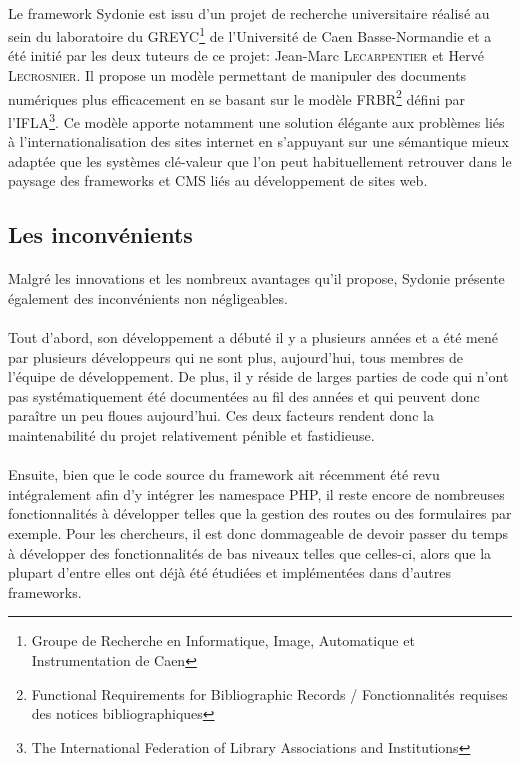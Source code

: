         \paragraph{}
        Le framework \og{}Sydonie\fg{} est issu d'un projet de recherche universitaire réalisé au sein du laboratoire du GREYC\footnote{Groupe de Recherche en Informatique, Image, Automatique et Instrumentation de Caen} de l'Université de Caen Basse-Normandie et a été initié par les deux tuteurs de ce projet: Jean-Marc \textsc{Lecarpentier} et Hervé \textsc{Lecrosnier}. Il propose un modèle permettant de manipuler des documents numériques plus efficacement en se basant sur le modèle FRBR\footnote{Functional Requirements for Bibliographic Records / Fonctionnalités requises des notices bibliographiques} défini par l'IFLA\footnote{The International Federation of Library Associations and Institutions}. Ce modèle apporte notamment une solution élégante aux problèmes liés à l'internationalisation des sites internet en s'appuyant sur une sémantique mieux adaptée que les systèmes \og{}clé-valeur\fg{} que l'on peut habituellement retrouver dans le paysage des frameworks et CMS liés au développement de sites web.


        \subsection{Les inconvénients}
        \paragraph{}
        Malgré les innovations et les nombreux avantages qu'il propose, Sydonie présente également des inconvénients non négligeables.

        \paragraph{}
        Tout d'abord, son développement a débuté il y a plusieurs années et a été mené par plusieurs développeurs qui ne sont plus, aujourd'hui, tous membres de l'équipe de développement. De plus, il y réside de larges parties de code qui n'ont pas systématiquement été documentées au fil des années et qui peuvent donc paraître un peu floues aujourd'hui. Ces deux facteurs rendent donc la maintenabilité du projet relativement pénible et fastidieuse.

        \paragraph{}
        Ensuite, bien que le code source du framework ait récemment été  revu intégralement afin d'y intégrer les namespace PHP, il reste encore de nombreuses fonctionnalités à développer telles que la gestion des routes ou des formulaires par exemple. Pour les chercheurs, il est donc dommageable de devoir passer du temps à développer des fonctionnalités de bas niveaux telles que celles-ci, alors que la plupart d'entre elles ont déjà été étudiées et implémentées dans d'autres frameworks.

